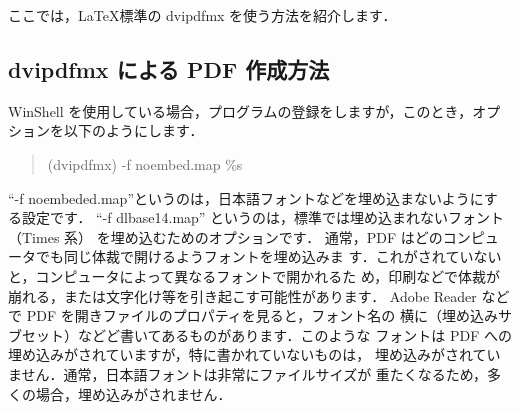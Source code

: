 \documentclass[a4paper, 10pt, dvips, fleqn, uplatex]{jsarticle}
\begin{document}
ここでは，\LaTeX 標準の dvipdfmx を使う方法を紹介します．

\subsection{dvipdfmx による PDF 作成方法}

WinShell を使用している場合，プログラムの登録をしますが，このとき，オプ
ションを以下のようにします．

\begin{quote}
 (dvipdfmx) -f noembed.map \%s
\end{quote}

``-f noembeded.map''というのは，日本語フォントなどを埋め込まないようにす
る設定です．
``-f dlbase14.map'' というのは，標準では埋め込まれないフォント（Times 系）
を埋め込むためのオプションです．
通常，PDF はどのコンピュータでも同じ体裁で開けるようフォントを埋め込みま
す．これがされていないと，コンピュータによって異なるフォントで開かれるた
め，印刷などで体裁が崩れる，または文字化け等を引き起こす可能性があります．
Adobe Reader などで PDF を開きファイルのプロパティを見ると，フォント名の
横に（埋め込みサブセット）などど書いてあるものがあります．このような
フォントは PDF への埋め込みがされていますが，特に書かれていないものは，
埋め込みがされていません．通常，日本語フォントは非常にファイルサイズが
重たくなるため，多くの場合，埋め込みがされません．
\end{document}
